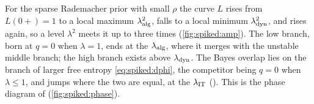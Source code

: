 \begin{refsection}
For the sparse Rademacher prior with small $\rho$ the curve $L$ rises from $L(0+)=1$ to a local maximum $\lambda_{\mathrm{alg}}^2$, falls to a local minimum $\lambda_{\mathrm{dyn}}^2$, and rises again, so a level $\lambda^2$ meets it up to three times (\cref{fig:spiked:amp}). The low branch, born at $q=0$ when $\lambda=1$, ends at the  $\lambda_{\mathrm{alg}}$, where it merges with the unstable middle branch; the high branch exists above $\lambda_{\mathrm{dyn}}$. The Bayes overlap lies on the branch of larger free entropy \eqref{eq:spiked:dphi}, the competitor being $q=0$ when $\lambda\le1$, and jumps where the two are equal, at the  $\lambda_{\mathrm{IT}}$ (). This is the phase diagram of \textcite{LesieurKrzakalaZdeborova2017} (\cref{fig:spiked:phase}).


\end{refsection}
